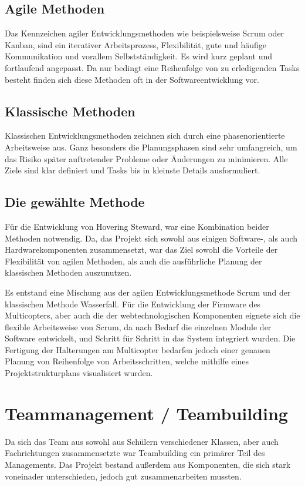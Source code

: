   \subsection{Agile Methoden}
  Das Kennzeichen agiler Entwicklungsmethoden wie beispielsweise Scrum oder Kanban, sind
  ein iterativer Arbeitsprozess, Flexibilität, gute und häufige Kommunikation und vorallem
  Selbstständigkeit. Es wird kurz geplant und fortlaufend angepasst. Da nur bedingt eine Reihenfolge
  von zu erledigenden Tasks besteht finden sich diese Methoden oft in der Softwareentwicklung vor.

  \subsection{Klassische Methoden}
  Klassischen Entwicklungsmethoden zeichnen sich durch eine phasenorientierte Arbeitsweise aus.
  Ganz besonders die Planungsphasen sind sehr umfangreich, um das Risiko später auftretender Probleme oder
  Änderungen zu minimieren. Alle Ziele sind klar definiert und Tasks bis in kleinste Details ausformuliert.

  \subsection{Die gewählte Methode}
  Für die Entwicklung von Hovering Steward, war eine Kombination beider Methoden notwendig. Da,
  das Projekt sich sowohl aus einigen Software-, als auch Hardwarekomponenten zusammensetzt, war das
  Ziel sowohl die Vorteile der Flexibilität von agilen Methoden, als auch die ausführliche Planung der klassischen
  Methoden auszunutzen.

  Es entstand eine Mischung aus der agilen Entwicklungsmethode Scrum und der klassischen Methode Wasserfall.
  Für die Entwicklung der Firmware des Multicopters, aber auch die der webtechnologischen Komponenten eignete
  sich die flexible Arbeitsweise von Scrum, da nach Bedarf die einzelnen Module der Software entwickelt, und Schritt
  für Schritt in das System integriert wurden.
  Die Fertigung der Halterungen am Multicopter bedarfen jedoch einer genauen Planung von Reihenfolge von Arbeitsschritten,
  welche mithilfe eines Projektstrukturplans visualisiert wurden.

\section{Teammanagement / Teambuilding}
Da sich das Team aus sowohl aus Schülern verschiedener Klassen, aber auch Fachrichtungen
zusammensetzte war Teambuilding ein primärer Teil des Managements. Das Projekt bestand außerdem
aus Komponenten, die sich stark voneinader unterschieden, jedoch gut zusammenarbeiten mussten.


